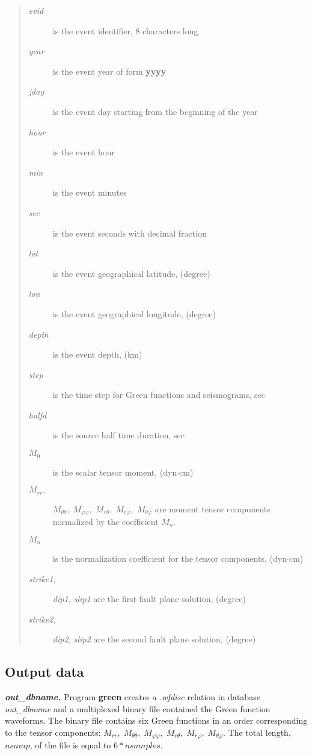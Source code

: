 \begin{quote}
\begin{description}
\item[{\it evid}] is the event identifier, 8 characters long 
\item[{\it year}] is the event year of form {\bf yyyy} 
\item[{\it jday}] is the event day starting from the beginning of the year 
\item[{\it hour}] is the event hour
\item[{\it min}] is the event minutes
\item[{\it sec}] is the event seconds with decimal fraction
\item[{\it lat}] is the event geographical latitude, (degree)
\item[{\it lon}] is the event geographical longitude, (degree)
\item[{\it depth}] is the event depth, (km)
\item[{\it step}] is the time step for Green functions and seismograms, sec
\item[{\it halfd}] is the source half time duration, sec
\item[$M_0$] is the scalar tensor moment, (dyn$\cdot$cm)
\item[$M_{rr},$] $M_{\theta \theta},\;M_{\varphi\varphi},\;
M_{r \theta},\; M_{r \varphi},\; M_{\theta\varphi}$ are moment 
  tensor components normalized by the coefficient $M_n$.
\item[$M_n$] is the normalization coefficient for the tensor components,
(dyn$\cdot$cm)
\item[{\it strike1,}] {\it dip1, slip1} are the first fault plane
  solution, (degree)
\item[{\it strike2,}] {\it dip2, slip2} are the second fault plane
  solution, (degree)
\end{description}
\end{quote}

\subsection {Output data}

\textbf{\large \emph{out\_dbname.}} Program {\bf green} creates a {\it .wfdisc}
relation in database {\it out\_dbname} and a  multiplexed binary file contained
the Green function waveforms.
The binary file contains six Green functions in  an order corresponding to the
tensor components:
$M_{rr},\; M_{\theta \theta},\;M_{\varphi\varphi},\;
M_{r \theta},\; M_{r \varphi},\; M_{\theta\varphi}$. The total length,
$nsamp$, of the file is equal to $6*nsamples$. 

